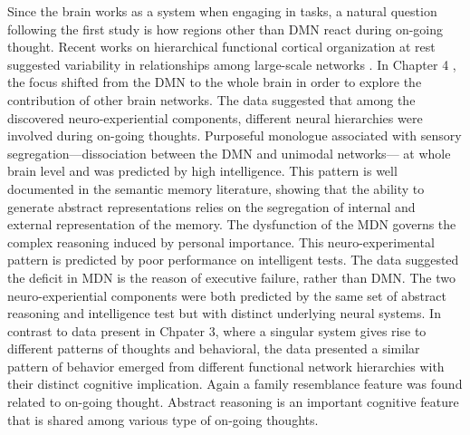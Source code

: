 Since the brain works as a system when engaging in tasks, a natural question following the first study is how regions other than DMN react during on-going thought. Recent works on hierarchical functional cortical organization at rest suggested variability in relationships among large-scale networks \cite{Margulies2016}. In Chapter 4 %
, the focus shifted from the DMN to the whole brain in order to explore the contribution of other brain networks. The data suggested that among the discovered neuro-experiential components, different neural hierarchies were involved during on-going thoughts. Purposeful monologue associated with sensory segregation---dissociation between the DMN and unimodal networks--- at whole brain level and was predicted by high intelligence. This pattern is well documented in the semantic memory literature, showing that the ability to generate abstract representations relies on the segregation of internal and external representation of the memory. The dysfunction of the MDN \cite{Duncan2010} governs the complex reasoning induced by personal importance. This neuro-experimental pattern is predicted by poor performance on intelligent tests. The data suggested the deficit in MDN is the reason of executive failure, rather than DMN. The two neuro-experiential components were both predicted by the same set of abstract reasoning and intelligence test but with distinct underlying neural systems. In contrast to data present in Chpater 3, where a singular system gives rise to different patterns of thoughts and behavioral, the data presented a similar pattern of behavior emerged from different functional network hierarchies with their distinct cognitive implication. Again a family resemblance feature was found related to on-going thought. Abstract reasoning is an important cognitive feature that is shared among various type of on-going thoughts. 

